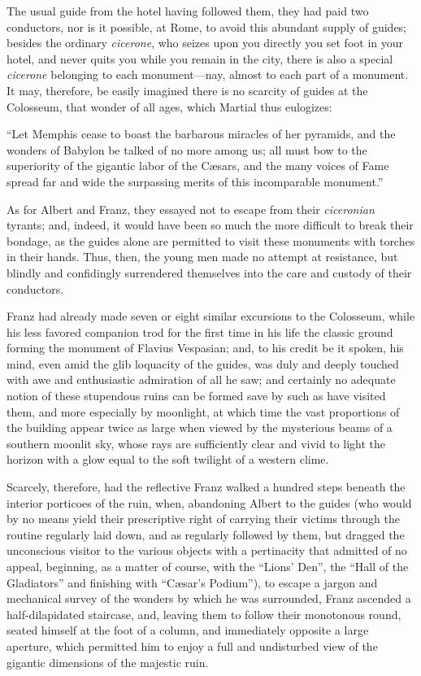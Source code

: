 The usual guide from the hotel having followed them, they had paid two
conductors, nor is it possible, at Rome, to avoid this abundant supply
of guides; besides the ordinary \textit{cicerone}, who seizes upon you
directly you set foot in your hotel, and never quits you while you
remain in the city, there is also a special \textit{cicerone} belonging to
each monument—nay, almost to each part of a monument. It may,
therefore, be easily imagined there is no scarcity of guides at the
Colosseum, that wonder of all ages, which Martial thus eulogizes:

“Let Memphis cease to boast the barbarous miracles of her pyramids, and
the wonders of Babylon be talked of no more among us; all must bow to
the superiority of the gigantic labor of the Cæsars, and the many
voices of Fame spread far and wide the surpassing merits of this
incomparable monument.”

As for Albert and Franz, they essayed not to escape from their
\textit{ciceronian} tyrants; and, indeed, it would have been so much the more
difficult to break their bondage, as the guides alone are permitted to
visit these monuments with torches in their hands. Thus, then, the
young men made no attempt at resistance, but blindly and confidingly
surrendered themselves into the care and custody of their conductors.

Franz had already made seven or eight similar excursions to the
Colosseum, while his less favored companion trod for the first time in
his life the classic ground forming the monument of Flavius Vespasian;
and, to his credit be it spoken, his mind, even amid the glib loquacity
of the guides, was duly and deeply touched with awe and enthusiastic
admiration of all he saw; and certainly no adequate notion of these
stupendous ruins can be formed save by such as have visited them, and
more especially by moonlight, at which time the vast proportions of the
building appear twice as large when viewed by the mysterious beams of a
southern moonlit sky, whose rays are sufficiently clear and vivid to
light the horizon with a glow equal to the soft twilight of a western
clime.

Scarcely, therefore, had the reflective Franz walked a hundred steps
beneath the interior porticoes of the ruin, when, abandoning Albert to
the guides (who would by no means yield their prescriptive right of
carrying their victims through the routine regularly laid down, and as
regularly followed by them, but dragged the unconscious visitor to the
various objects with a pertinacity that admitted of no appeal,
beginning, as a matter of course, with the “Lions’ Den”, the “Hall of
the Gladiators” and finishing with “Cæsar’s Podium”), to escape a
jargon and mechanical survey of the wonders by which he was surrounded,
Franz ascended a half-dilapidated staircase, and, leaving them to
follow their monotonous round, seated himself at the foot of a column,
and immediately opposite a large aperture, which permitted him to enjoy
a full and undisturbed view of the gigantic dimensions of the majestic
ruin.

